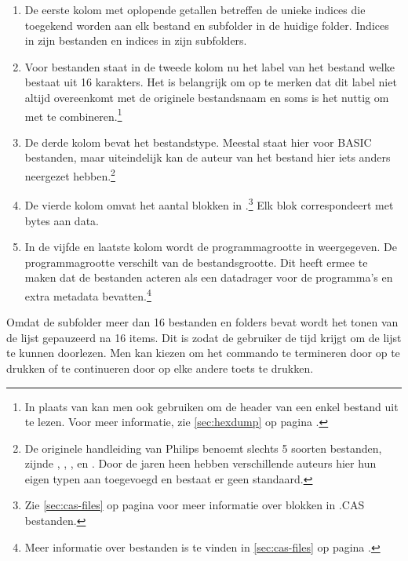 \begin{enumerate}[noitemsep]
    \item De eerste kolom met oplopende getallen betreffen de unieke indices die toegekend worden aan elk bestand en subfolder in de huidige folder. Indices in  zijn bestanden en indices in  zijn subfolders.  
    
    \item Voor \cas bestanden staat in de tweede kolom nu het label van het bestand welke bestaat uit 16 karakters. Het is belangrijk om op te merken dat dit label niet altijd overeenkomt met de originele bestandsnaam en soms is het nuttig om  met  te combineren.\footnote{In plaats van  kan men ook  gebruiken om de header van een enkel bestand uit te lezen. Voor meer informatie, zie \cref{sec:hexdump} op pagina \pageref{sec:hexdump}.}
    
    \item De derde kolom bevat het bestandstype. Meestal staat hier  voor BASIC bestanden, maar uiteindelijk kan de auteur van het \cas bestand hier iets anders neergezet hebben.\footnote{De originele \pc handleiding van Philips benoemt slechts 5 soorten bestanden, zijnde , , ,  en . Door de jaren heen hebben verschillende auteurs hier hun eigen typen aan toegevoegd en bestaat er geen standaard.} 
    
    \item De vierde kolom omvat het aantal blokken in .\footnote{Zie \cref{sec:cas-files} op pagina \pageref{sec:cas-files} voor meer informatie over blokken in .CAS bestanden.} Elk blok correspondeert met  bytes aan data.
    
    \item In de vijfde en laatste kolom wordt de programmagrootte in  weergegeven. De programmagrootte verschilt van de bestandsgrootte. Dit heeft ermee te maken dat de \cas bestanden acteren als een datadrager voor de programma's en extra metadata bevatten.\footnote{Meer informatie over \cas bestanden is te vinden in \cref{sec:cas-files} op pagina \pageref{sec:cas-files}.}
\end{enumerate}

Omdat de subfolder  meer dan 16 bestanden en folders bevat wordt het tonen van de lijst gepauzeerd na 16 items. Dit is zodat de gebruiker de tijd krijgt om de lijst te kunnen doorlezen. Men kan kiezen om het commando te termineren door op  te drukken of te continueren door op elke andere toets te drukken.

